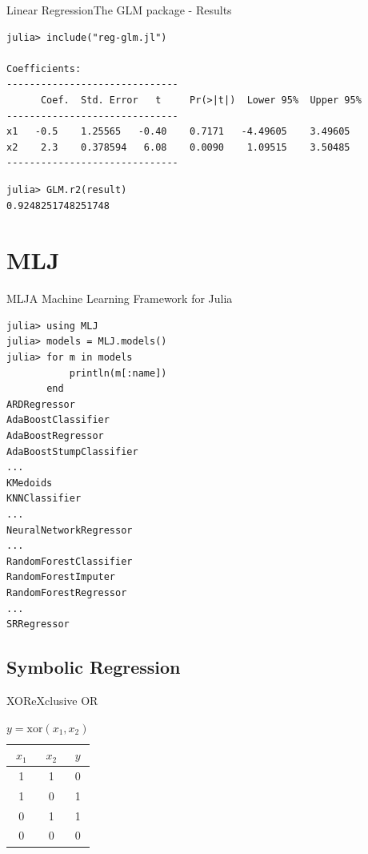 \documentclass[11pt]{beamer}
\begin{document}
\begin{frame}[fragile]{Linear Regression}{The GLM package - Results}
\begin{lstlisting}[basicstyle=\tiny]
julia> include("reg-glm.jl")
	
Coefficients:
------------------------------
	  Coef.  Std. Error   t     Pr(>|t|)  Lower 95%  Upper 95%
------------------------------
x1   -0.5    1.25565   -0.40    0.7171   -4.49605    3.49605
x2    2.3    0.378594   6.08    0.0090    1.09515    3.50485
------------------------------
\end{lstlisting}

\begin{lstlisting}
julia> GLM.r2(result)
0.9248251748251748
\end{lstlisting}


\end{frame}


\section{MLJ}
\begin{frame}[fragile]{MLJ}{A Machine Learning Framework for Julia}
\begin{lstlisting}[basicstyle=\tiny]
julia> using MLJ
julia> models = MLJ.models()
julia> for m in models
           println(m[:name])
       end
ARDRegressor
AdaBoostClassifier
AdaBoostRegressor
AdaBoostStumpClassifier
...
KMedoids
KNNClassifier
...
NeuralNetworkRegressor
...
RandomForestClassifier
RandomForestImputer
RandomForestRegressor
...
SRRegressor
\end{lstlisting}
\end{frame}

\subsection{Symbolic Regression}
\begin{frame}[fragile]{XOR}{eXclusive OR}
\begin{table}
\centering
\begin{tabular}{|c|c|c|}
	\hline
	$x_1$ & $x_2$ & $y$ \\
	\hline 
	1 & 1 & 0 \\
	\hline 
	1 & 0 & 1 \\
	\hline 
	0 & 1 & 1 \\
	\hline 
	0 & 0 & 0 \\
	\hline 
\end{tabular}
\caption{$y = \text{xor}(x_1, x_2)$}
\end{table}
\end{frame}
\end{document}
